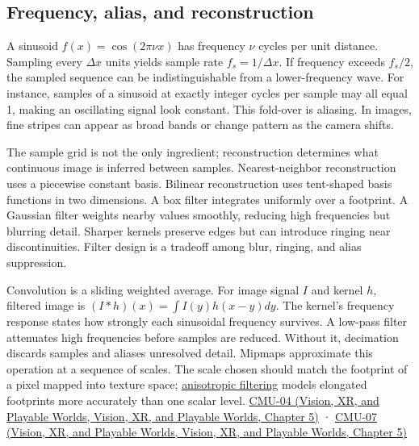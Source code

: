 \subsection{Frequency, alias, and reconstruction}\label{03-visual-computing-i-ch003-frequency-alias-and-reconstruction}

A sinusoid \(f(x)=\cos(2\pi \nu x)\) has frequency \(\nu\) cycles per unit distance. Sampling every \(\Delta x\) units yields sample rate \(f_s=1/\Delta x\). If frequency exceeds \(f_s/2\), the sampled sequence can be indistinguishable from a lower-frequency wave. For instance, samples of a sinusoid at exactly integer cycles per sample may all equal 1, making an oscillating signal look constant. This fold-over is aliasing. In images, fine stripes can appear as broad bands or change pattern as the camera shifts.

The sample grid is not the only ingredient; reconstruction determines what continuous image is inferred between samples. Nearest-neighbor reconstruction uses a piecewise constant basis. Bilinear reconstruction uses tent-shaped basis functions in two dimensions. A box filter integrates uniformly over a footprint. A Gaussian filter weights nearby values smoothly, reducing high frequencies but blurring detail. Sharper kernels preserve edges but can introduce ringing near discontinuities. Filter design is a tradeoff among blur, ringing, and alias suppression.

Convolution is a sliding weighted average. For image signal \(I\) and kernel \(h\), filtered image is \((I*h)(x)=\int I(y)h(x-y)dy\). The kernel's frequency response states how strongly each sinusoidal frequency survives. A low-pass filter attenuates high frequencies before samples are reduced. Without it, decimation discards samples and aliases unresolved detail. Mipmaps approximate this operation at a sequence of scales. The scale chosen should match the footprint of a pixel mapped into texture space; \hyperref[appendix-d5b3c692d9f0]{anisotropic filtering} models elongated footprints more accurately than one scalar level. \href{../07-Vision-XR-and-Playable-Worlds/main.pdf\#nameddest=04-visual-computing-ii-ch036-cmu-04---drawing-a-triangle-and-an-intro-to-sampling}{CMU-04 (Vision, XR, and Playable Worlds, Vision, XR, and Playable Worlds, Chapter 5)} · \href{../07-Vision-XR-and-Playable-Worlds/main.pdf\#nameddest=04-visual-computing-ii-ch036-cmu-07---perspective-projection-and-texture-mapping}{CMU-07 (Vision, XR, and Playable Worlds, Vision, XR, and Playable Worlds, Chapter 5)}

